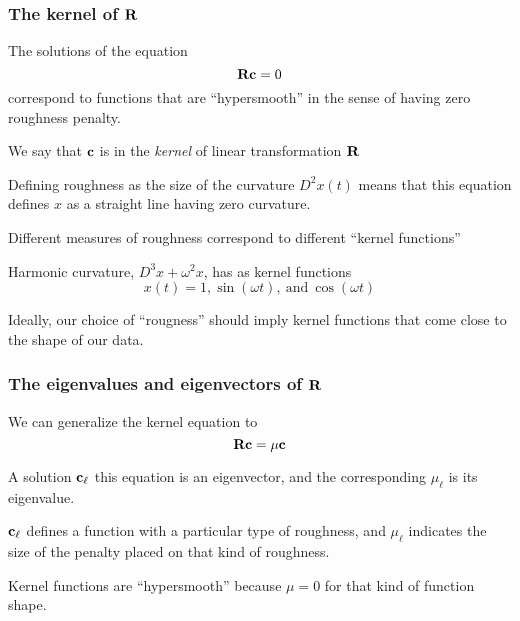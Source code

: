\documentclass[11pt]{beamer}
\begin{document}
\begin{frame}

\frametitle{The kernel of  $\mbox{\bf R}$}

\bi
  \item The solutions of the equation
  \[
    \mbox{\bf R} \mbox{\bf c} = 0
  \]
  correspond to functions that are ``hypersmooth'' in the sense of having zero roughness penalty.
  \item We say that $\mbox{\bf c}$ is in the \emph{kernel} of linear transformation $\mbox{\bf R}$
  \item Defining roughness as the size of the curvature $D^2 x(t)$ means that this equation defines
  $x$ as a straight line having zero curvature.
  \item Different measures of roughness correspond to different ``kernel functions''
  \item Harmonic curvature, $D^3 x + \omega^2 x$, has as kernel functions 
  \[
    x(t) = 1, \sin(\omega t), \ \mbox{and} \ \cos(\omega t)
  \]
  \item Ideally, our choice of ``rougness'' should imply kernel functions that come close to the shape of our data.
\ei

\end{frame}


\begin{frame}

\frametitle{The eigenvalues and eigenvectors of  $\mbox{\bf R}$}

\bi
  \item We can generalize the kernel equation to
  \[
    \mbox{\bf R} \mbox{\bf c} = \mu \mbox{\bf c}
  \]
  \item A solution $\mbox{\bf c}_\ell$ this equation is an eigenvector, and the corresponding $\mu_\ell$ is its eigenvalue.
  \item $\mbox{\bf c}_\ell$ defines a function with a particular type of roughness, and $\mu_\ell$ indicates the size
  of the penalty placed on that kind of roughness.  
  \item Kernel functions are ``hypersmooth'' because $\mu = 0$ for that kind of function shape.
\ei

\end{frame}

\end{document}
